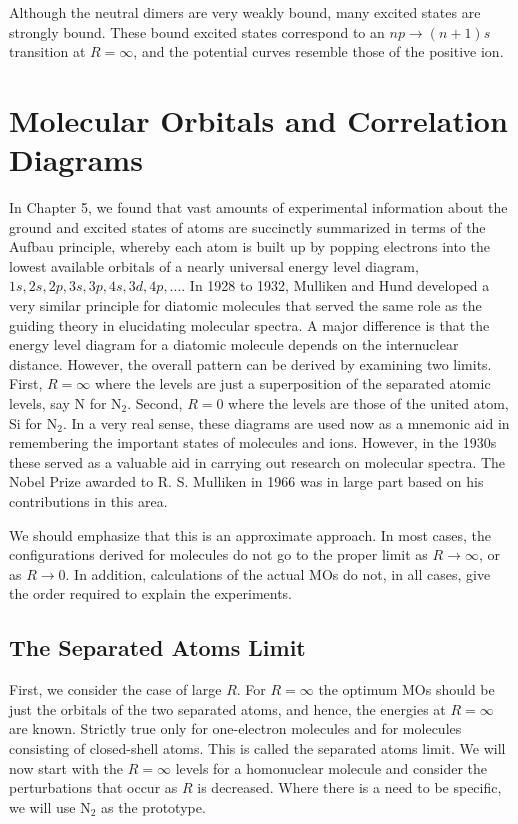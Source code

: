 Although the neutral dimers are very weakly bound, many excited
states are strongly bound.  These bound excited states correspond to an
$np \rightarrow (n + 1)s$ transition at $R = \infty$, and the potential 
curves resemble those of the positive ion.

\section{Molecular Orbitals and Correlation Diagrams}

In Chapter 5, we found that vast amounts of experimental 
information about the ground and excited states of atoms 
are succinctly summarized in terms of the Aufbau principle, 
whereby each atom is built up by popping electrons into the 
lowest available orbitals of a nearly universal energy level 
diagram, $1s, 2s, 2p, 3s, 3p, 4s, 3d, 4p,$....  In 1928 to 1932, 
Mulliken and Hund developed a very similar principle for 
diatomic molecules that served the same role as the guiding 
theory in elucidating molecular spectra. A major difference 
is that the energy level diagram for a diatomic molecule 
depends on the internuclear distance. However, the overall 
pattern can be derived by examining two limits.  First, $R = \infty$ 
where the levels are just a superposition of the separated 
atomic levels, say N for N$_2$.  Second, $R = 0$ where the levels 
are those of the united atom, Si for N$_2$. In a very real 
sense, these diagrams are used now as a mnemonic aid in 
remembering the important states of molecules and ions. However, 
in the 1930s these served as a valuable aid in carrying out 
research on molecular spectra.  The Nobel Prize awarded to R. S. 
Mulliken in 1966 was in large part based on his contributions in this area.
	
We should emphasize that this 
is an approximate approach. In most cases, the configurations 
derived for molecules do not go to the proper limit as $R \rightarrow 
\infty$, or as $R \rightarrow 0$.  In addition, calculations of the actual 
MOs do not, in all cases, give the order required to explain 
the experiments.

\subsection{The Separated Atoms Limit}

First, we consider the case of large $R$.  For $R = \infty$ the
optimum MOs should be just the orbitals of the two separated atoms,
and hence, the energies at $R = \infty$ are known. Strictly true only
for one-electron molecules and for molecules consisting of
closed-shell atoms.  This is called the separated atoms limit.  We
will now start with the $R = \infty$ levels for a homonuclear molecule
and consider the perturbations that occur as $R$ is decreased.  Where
there is a need to be specific, we will use N$_2$ as the prototype.

